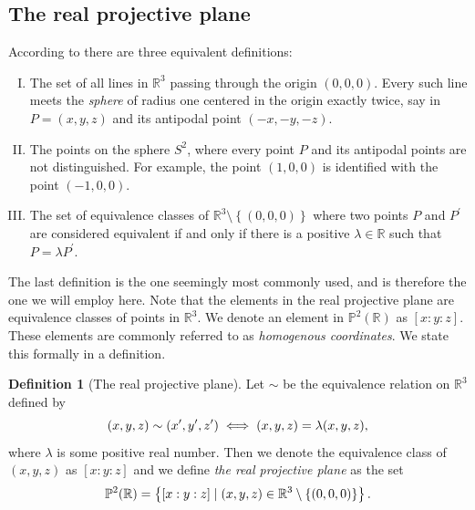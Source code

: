 \documentclass{article}
\theoremstyle{definition}
\newtheorem{defn}{Definition}
\theoremstyle{plain}
\newcommand{\proj}{\ensuremath{\mathbb{P}}} %
\newcommand{\R}{\ensuremath{\mathbb{R}}}    %
\newcommand{\projp}[3]{\ensuremath{[ #1 : #2 : #3 ]}}
\begin{document}
\subsection{The real projective plane}
According to \cite{Wik16} there are three equivalent definitions:

\begin{enumerate}[I.]
    \item\label{def:one} The set of all lines in $\R^3$ passing through the origin $\left( 0,
        0, 0 \right)$. Every such line meets the \emph{sphere} of radius one
        centered in the origin exactly twice, say in $P = (x, y, z)$ and its
        antipodal point $(-x, -y, -z)$.
    \item\label{def:two} The points on the sphere $S^2$, where every point $P$ and its
        antipodal points are not distinguished. For example, the point $(1, 0,
        0)$ is identified with the point $(-1, 0, 0)$.
    \item The set of equivalence classes of $\R^3 \setminus \left\{(0, 0, 0)\right\}$ where
        two points $P$ and $P^\prime$ are considered equivalent if and only if
        there is a positive $\lambda \in \R$ such that $P = \lambda P^\prime$.
\end{enumerate}

The last definition is the one seemingly most commonly used, and is therefore
the one we will employ here. Note that the elements in the real projective
plane are equivalence classes of points in $\R^3$. We denote an element in
$\proj^2(\R)$ as $\projp{x}{y}{z}$. These elements are commonly referred to as
\emph{homogenous coordinates}. We state this
formally in a definition.

\begin{defn}[The real projective plane]
    Let $\sim$ be the equivalence relation on $\R^3$ defined by
    \begin{equation}
        \notag
        (x, y, z) \sim (x', y', z') \iff (x, y, z) = \lambda(x, y, z),
    \end{equation}
    where $\lambda$ is some positive real number. Then we denote the
    equivalence class of $(x, y, z)$ as $\projp{x}{y}{z}$ and we define
    \emph{the real projective plane} as the set
    \begin{equation}
        \notag
        \proj^2(\R) = \left\{ \projp{x}{y}{z} \mid (x, y, z) \in \R^3 \setminus
        \left\{ (0, 0, 0) \right\} \right\}.
    \end{equation}
\end{defn}
\end{document}
